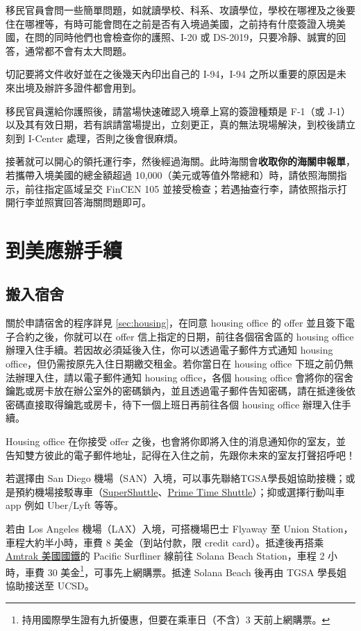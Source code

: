 \documentclass[10pt,a4paper]{book}
\begin{document}
\begin{CJK}{UTF8}{bkai}
移民官員會問一些簡單問題，如就讀學校、科系、攻讀學位，學校在哪裡及之後要住在哪裡等，有時可能會問在之前是否有入境過美國，之前持有什麼簽證入境美國，在問的同時他們也會檢查你的護照、I-20 或 DS-2019，只要冷靜、誠實的回答，通常都不會有太大問題。

切記要將文件收好並在之後幾天內印出自己的 I-94，I-94 之所以重要的原因是未來出境及辦許多證件都會用到。    

移民官員還給你護照後，請當場快速確認入境章上寫的簽證種類是 F‐1（或 J‐1）以及其有效日期，若有誤請當場提出，立刻更正，真的無法現場解決，到校後請立刻到 I-Center 處理，否則之後會很麻煩。

接著就可以開心的領托運行李，然後經過海關。此時海關會\textbf{收取你的海關申報單}，若攜帶入境美國的總金額超過 10,000（美元或等值外幣總和）時，請依照海關指示，前往指定區域呈交 FinCEN 105 並接受檢查；若遇抽查行李，請依照指示打開行李並照實回答海關問題即可。

\chapter{到美應辦手續}

\section{搬入宿舍}\label{sec:movein}
關於申請宿舍的程序詳見 \ref{sec:housing}，在同意 housing office 的 offer 並且簽下電子合約之後，你就可以在 offer 信上指定的日期，前往各個宿舍區的 housing office 辦理入住手續。若因故必須延後入住，你可以透過電子郵件方式通知 housing office，但仍需按原先入住日期繳交租金。若你當日在 housing office 下班之前仍無法辦理入住，請以電子郵件通知 housing office，各個 housing office 會將你的宿舍鑰匙或房卡放在辦公室外的密碼鎖內，並且透過電子郵件告知密碼，請在抵達後依密碼直接取得鑰匙或房卡，待下一個上班日再前往各個 housing office 辦理入住手續。

Housing office 在你接受 offer 之後，也會將你即將入住的消息通知你的室友，並告知雙方彼此的電子郵件地址，記得在入住之前，先跟你未來的室友打聲招呼吧！

若選擇由 San Diego 機場（SAN）入境，可以事先聯絡TGSA學長姐協助接機；或是預約機場接駁專車（\href{https://www.supershuttle.com/}{SuperShuttle}、\href{http://www.primetimeshuttle.com/}{Prime Time Shuttle}）；抑或選擇行動叫車 app 例如 Uber/Lyft 等等。

若由 Los Angeles 機場（LAX）入境，可搭機場巴士 Flyaway 至 Union Station，車程大約半小時，車費 8 美金（到站付款，限 credit card）。抵達後再搭乘 \href{http://www.amtrak.com}{Amtrak 美國國鐵}的 Pacific Surfliner 線前往 Solana Beach Station，車程 2 小時，車費 30 美金\footnote{持用國際學生證有九折優惠，但要在乘車日（不含）3 天前上網購票。}，可事先上網購票。抵達 Solana Beach 後再由 TGSA 學長姐協助接送至 UCSD。


\end{CJK}
\end{document}
